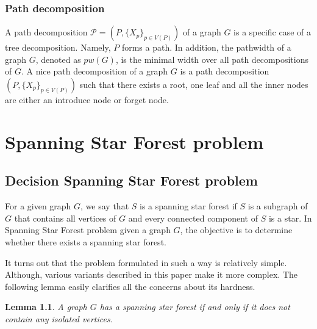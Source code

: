 \documentclass[en]{pracamgr}
\newtheorem{lemma}{Lemma}
\newcommand{\SSF}{Spanning Star Forest}
\newcommand{\ssf}{spanning star forest}
\begin{document}
\subsection{Path decomposition}

A path decomposition $\mathcal{P}=(P,\{X_p\}_{p \in V(P)})$ of a graph $G$ is a specific case of a tree decomposition. Namely, $P$ forms a path. In addition, the pathwidth of a graph $G$, denoted as $pw(G)$, is the minimal width over all path decompositions of $G$. A nice path decomposition of a graph $G$ is a path decomposition $(P,\{X_p\}_{p \in V(P)})$ such that there exists a root, one leaf and all the inner nodes are either an introduce node or forget node.

\chapter{Spanning Star Forest problem}\label{r:losers}

\section{Decision Spanning Star Forest problem}

For a given graph $G$, we say that $S$ is a \ssf{} if $S$ is a subgraph of $G$ that contains all vertices of $G$ and every connected component of $S$ is a star. In {\sc \SSF{}} problem given a graph $G$, the objective is to determine whether there exists a \ssf{}.

It turns out that the problem formulated in such a way is relatively simple. Although, various variants described in this paper make it more complex. The following lemma easily clarifies all the concerns about its hardness.

\begin{lemma}\label{SSF lemma}
 A graph $G$ has a \ssf{} if and only if it does not contain any isolated vertices.
\end{lemma}
\end{document}
